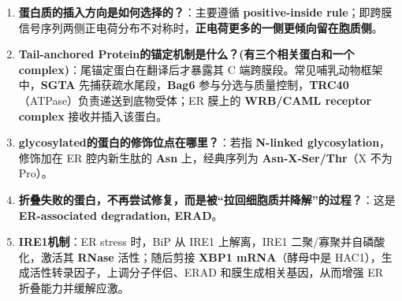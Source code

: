 \documentclass[12pt,fontset=none]{ctexart}
\begin{document}
\begin{enumerate}
\item \textbf{蛋白质的插入方向是如何选择的？}：主要遵循 \textbf{positive-inside rule}；即跨膜信号序列两侧正电荷分布不对称时，\textbf{正电荷更多的一侧更倾向留在胞质侧}。

\item \textbf{Tail-anchored Protein的锚定机制是什么？(有三个相关蛋白和一个complex)}：尾锚定蛋白在翻译后才暴露其 C 端跨膜段。常见哺乳动物框架中，\textbf{SGTA} 先捕获疏水尾段，\textbf{Bag6} 参与分选与质量控制，\textbf{TRC40}（ATPase）负责递送到底物受体；ER 膜上的 \textbf{WRB/CAML receptor complex} 接收并插入该蛋白。

\item \textbf{glycosylated的蛋白的修饰位点在哪里？}：若指 \textbf{N-linked glycosylation}，修饰加在 ER 腔内新生肽的 \textbf{Asn} 上，经典序列为 \textbf{Asn-X-Ser/Thr}（X 不为 Pro）。

\item \textbf{折叠失败的蛋白，不再尝试修复，而是被“拉回细胞质并降解”的过程？}：这是 \textbf{ER-associated degradation, ERAD}。

\item \textbf{IRE1机制}：ER stress 时，BiP 从 IRE1 上解离，IRE1 二聚/寡聚并自磷酸化，激活其 \textbf{RNase} 活性；随后剪接 \textbf{XBP1 mRNA}（酵母中是 HAC1），生成活性转录因子，上调分子伴侣、ERAD 和膜生成相关基因，从而增强 ER 折叠能力并缓解应激。

\end{enumerate}
\end{document}
